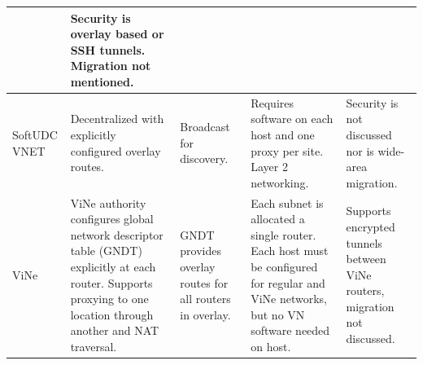 \begin{table}[ht]
{\begin{tabular}{|p{.8in}||p{1.25in}|p{1.2in}|p{1.25in}|p{1.25in}|}
&
Security is overlay based or SSH tunnels.  Migration not mentioned.
\\ \hline
SoftUDC VNET
&
Decentralized with explicitly configured overlay routes.
&
Broadcast for discovery.
&
Requires software on each host and one proxy per site.  Layer 2 networking.
&
Security is not discussed nor is wide-area migration.
\\ \hline
ViNe
&
ViNe authority configures global network descriptor table (GNDT) explicitly at
each router. Supports proxying to one location through another and NAT traversal.
&
GNDT provides overlay routes for all routers in overlay.
&
Each subnet is allocated a single router.  Each host must be configured for
regular and ViNe networks, but no VN software needed on host.
&
Supports encrypted tunnels between ViNe routers, migration not discussed.
\\ \hline
\end{tabular}
}
\end{table}

